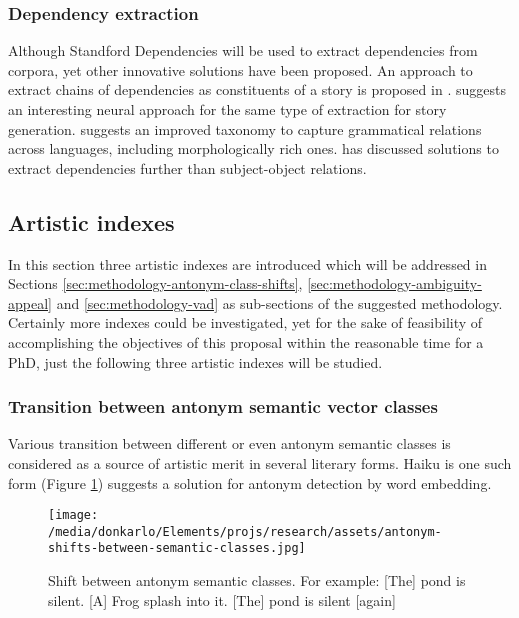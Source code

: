 \documentclass{article}
\begin{document}
	\subsubsection{Dependency extraction}
	\label{sec:related-works-dependency-extraction}
	Although Standford Dependencies \citep{schuster-2016-enhanced-english-universal-dependencies-an-improved-representation-for-natural-language-understanding-tasks} will be used to extract dependencies from corpora, yet other innovative solutions have been proposed. An approach to extract chains of dependencies as constituents of a story is proposed in  \citep{chambers-2008-unsupervised-learning-of-narrative-event-chains}.
	\citet{martin-2018-event-representations-for-automated-story-generation-with-deep-neural-nets} suggests an interesting neural approach for the same type of extraction for story generation.	
	\cite{de-marneffe-2014-universal-stanford-dependencies-a-cross-linguistic-typology} suggests an improved taxonomy to capture grammatical
	relations across languages, including morphologically rich ones.  \cite{nivre-2016-universal-dependencies-v1-a-multilingual-treebank-collection} has discussed solutions to extract dependencies further than subject-object relations. 
	\subsection{Artistic indexes} \label{sec:related-works-artistic-merit-indexes}
	In this section three artistic indexes are introduced which will be addressed in Sections \ref{sec:methodology-antonym-class-shifts}, \ref{sec:methodology-ambiguity-appeal} and \ref{sec:methodology-vad} as sub-sections of the suggested methodology. Certainly more indexes could be investigated, yet for the sake of feasibility of accomplishing the objectives of this proposal within the reasonable time for a PhD, just the following three artistic indexes will be studied. 
	\subsubsection{Transition between antonym semantic vector classes}
	Various transition between different or even antonym semantic classes is considered as a source of artistic merit in several literary forms. Haiku is one such form (Figure \ref{fig:antonym-shifts-between-semantic-classes}) \citet{ono-2015-word-embedding-based-antonym-detection-using-thesauri-and-distributional-information} suggests a solution for antonym detection by word embedding. 
	\begin{figure}[h!]
		\centering
		\texttt{[image: /media/donkarlo/Elements/projs/research/assets/antonym-shifts-between-semantic-classes.jpg]}
		\caption{Shift between antonym semantic classes. For example: [The] pond is silent. [A] Frog splash into it. [The] pond is silent [again]}
		\label{fig:antonym-shifts-between-semantic-classes}
	\end{figure}
\end{document}
